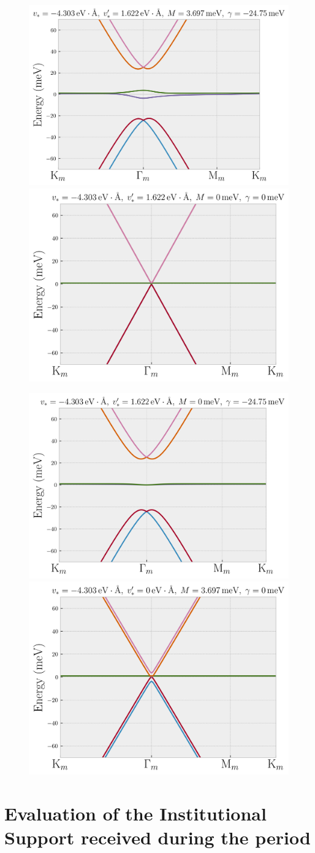 \documentclass[12pt]{report}
\begin{document}
\begin{figure}[H]
\centering
\includegraphics[height=0.35\linewidth]{fig/thf-correct_params.png}
\includegraphics[height=0.35\linewidth]{fig/thf-no_M_no_gamma.png}
\label{fig:thf-correct_params}
\end{figure}

\begin{figure}[H]
\centering
\includegraphics[height=0.35\linewidth]{fig/thf-no_M.png}
\includegraphics[height=0.35\linewidth]{fig/thf-no_coupling.png}
\label{fig:thf-exploration}
\end{figure}


\chapter{Evaluation of the Institutional Support received during the period} \label{chp:apoioInst}
\end{document}
